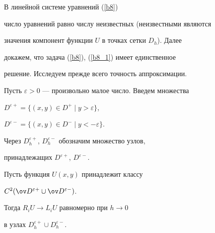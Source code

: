 \smallskip





В линейной системе уравнений (\ref{b8})


число уравнений равно числу неизвестных (неизвестными являются


значения компонент функции $U$ в точках сетки $D_h$). Далее


докажем, что задача (\ref{b8}), (\ref{b8_1}) имеет единственное


решение. Исследуем прежде всего точность аппроксимации.


Пусть $\varepsilon>0$ --- произвольно малое число. Введем множества


$D^{\varepsilon+}=\{(x,y)\in D^+\mid y>\varepsilon\}$,


$D^{\varepsilon-}=\{(x,y)\in D^-\mid y<-\varepsilon\}$.


Через $D^{\varepsilon+}_h$, $D^{\varepsilon-}_h$ обозначим множество узлов,


принадлежащих $D^{\varepsilon+}$, $D^{\varepsilon-}$.





\begin{lem}


Пусть функция $U(x,y)$ принадлежит классу


$C^2(\ov D{}^{\varepsilon+}\cup \ov D{}^{\varepsilon-})$.


Тогда $R_iU \to L_iU$ равномерно при $h\to 0$


в узлах $D_h^{\varepsilon+} \cup D_h^{\varepsilon-}$.


\end{lem}








